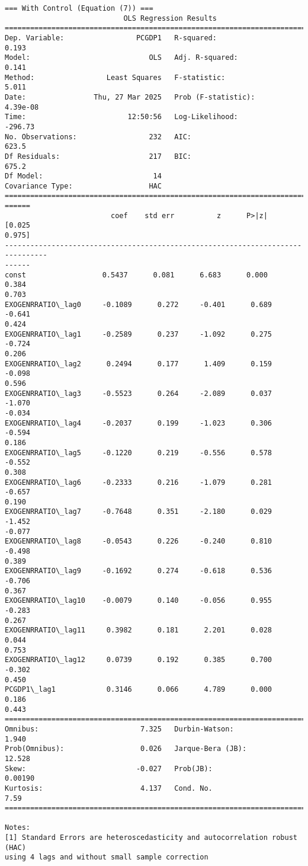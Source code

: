 \documentclass[11pt]{article}
\begin{document}
\begin{Verbatim}[commandchars=\\\{\}]
=== With Control (Equation (7)) ===
                            OLS Regression Results
==============================================================================
Dep. Variable:                 PCGDP1   R-squared:                       0.193
Model:                            OLS   Adj. R-squared:                  0.141
Method:                 Least Squares   F-statistic:                     5.011
Date:                Thu, 27 Mar 2025   Prob (F-statistic):           4.39e-08
Time:                        12:50:56   Log-Likelihood:                -296.73
No. Observations:                 232   AIC:                             623.5
Df Residuals:                     217   BIC:                             675.2
Df Model:                          14
Covariance Type:                  HAC
================================================================================
======
                         coef    std err          z      P>|z|      [0.025
0.975]
--------------------------------------------------------------------------------
------
const                  0.5437      0.081      6.683      0.000       0.384
0.703
EXOGENRRATIO\_lag0     -0.1089      0.272     -0.401      0.689      -0.641
0.424
EXOGENRRATIO\_lag1     -0.2589      0.237     -1.092      0.275      -0.724
0.206
EXOGENRRATIO\_lag2      0.2494      0.177      1.409      0.159      -0.098
0.596
EXOGENRRATIO\_lag3     -0.5523      0.264     -2.089      0.037      -1.070
-0.034
EXOGENRRATIO\_lag4     -0.2037      0.199     -1.023      0.306      -0.594
0.186
EXOGENRRATIO\_lag5     -0.1220      0.219     -0.556      0.578      -0.552
0.308
EXOGENRRATIO\_lag6     -0.2333      0.216     -1.079      0.281      -0.657
0.190
EXOGENRRATIO\_lag7     -0.7648      0.351     -2.180      0.029      -1.452
-0.077
EXOGENRRATIO\_lag8     -0.0543      0.226     -0.240      0.810      -0.498
0.389
EXOGENRRATIO\_lag9     -0.1692      0.274     -0.618      0.536      -0.706
0.367
EXOGENRRATIO\_lag10    -0.0079      0.140     -0.056      0.955      -0.283
0.267
EXOGENRRATIO\_lag11     0.3982      0.181      2.201      0.028       0.044
0.753
EXOGENRRATIO\_lag12     0.0739      0.192      0.385      0.700      -0.302
0.450
PCGDP1\_lag1            0.3146      0.066      4.789      0.000       0.186
0.443
==============================================================================
Omnibus:                        7.325   Durbin-Watson:                   1.940
Prob(Omnibus):                  0.026   Jarque-Bera (JB):               12.528
Skew:                          -0.027   Prob(JB):                      0.00190
Kurtosis:                       4.137   Cond. No.                         7.59
==============================================================================

Notes:
[1] Standard Errors are heteroscedasticity and autocorrelation robust (HAC)
using 4 lags and without small sample correction
    \end{Verbatim}
\end{document}
